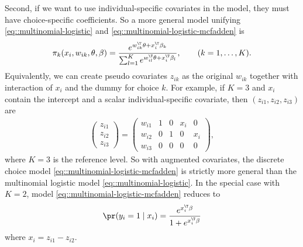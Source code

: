 Second, if we want to use individual-specific covariates in the model, they must have choice-specific coefficients. So a more general model unifying \eqref{eq::multinomial-logistic} and \eqref{eq::multinomial-logistic-mcfadden} is
\begin{eqnarray}
\pi_{k}(x_{i}, w_{ik}, \theta, \beta)=\frac{e^{  w_{ik}^{\T}\theta + x_i^{\T} \beta_k }  }{\sum_{ l =1}^{K}e^{ w_{i l }^{\T}\theta + x_i^{\T} \beta_{ l } }},\qquad(k=1,\ldots,K) .
\label{eq::multinomial-logistic-unify}
\end{eqnarray}
Equivalently, we can create pseudo covariates $z_{ik}$ as the original $w_{ik}$ together with interaction of $x_i$ and the dummy for choice $k$. For example, if $K = 3$ and $x_i$ contain the intercept and a scalar individual-specific covariate, then $(z_{i1}, z_{i2}, z_{i3})$ are
\begin{eqnarray*}
\begin{pmatrix}
z_{i1} \\
z_{i2} \\
z_{i3}
\end{pmatrix}
= 
\begin{pmatrix}
w_{i1} & 1 & 0 & x_i & 0 \\
w_{i2} & 0 & 1 & 0 & x_i \\
w_{i3} & 0 & 0 & 0 & 0
\end{pmatrix},
\end{eqnarray*}
where $K=3$ is the reference level. 
So with augmented covariates, the discrete choice model \eqref{eq::multinomial-logistic-mcfadden} is strictly more general than the multinomial logistic model \eqref{eq::multinomial-logistic}. In the special case with $K=2$, model \eqref{eq::multinomial-logistic-mcfadden} reduces to
$$
\pr(y_i = 1\mid   x_i ) = \frac{  e^{  x_i^{\T} \beta }   }{   1 + e^{  x_i^{\T} \beta }  }
$$
where $x_i = z_{i1} - z_{i2}$. 




